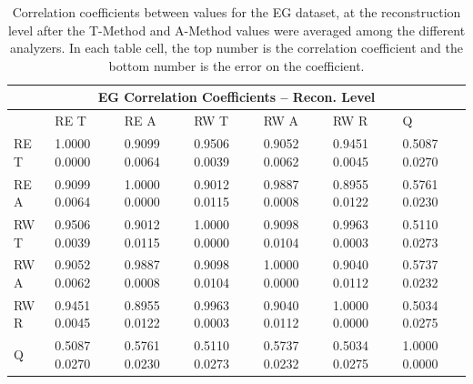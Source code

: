\begin{table}
\setlength\tabcolsep{15pt}
\small
\centering
\renewcommand{\arraystretch}{1.4}
\begin{tabularx}{0.8\linewidth}{@{\extracolsep{\fill}}lXXXXXX}
  \toprule
  	\multicolumn{7}{c}{{\normalsize EG Correlation Coefficients -- Recon. Level}} \\
  \midrule
  	       & RE T & RE A & RW T & RW A & RW R & \quad Q \\
  \midrule
	RE T   & 1.0000 0.0000 & 0.9099 0.0064 & 0.9506 0.0039 & 0.9052 0.0062 & 0.9451 0.0045 & 0.5087 0.0270  \\
	RE A   & 0.9099 0.0064 & 1.0000 0.0000 & 0.9012 0.0115 & 0.9887 0.0008 & 0.8955 0.0122 & 0.5761 0.0230  \\
	RW T   & 0.9506 0.0039 & 0.9012 0.0115 & 1.0000 0.0000 & 0.9098 0.0104 & 0.9963 0.0003 & 0.5110 0.0273  \\
	RW A   & 0.9052 0.0062 & 0.9887 0.0008 & 0.9098 0.0104 & 1.0000 0.0000 & 0.9040 0.0112 & 0.5737 0.0232  \\
	RW R   & 0.9451 0.0045 & 0.8955 0.0122 & 0.9963 0.0003 & 0.9040 0.0112 & 1.0000 0.0000 & 0.5034 0.0275  \\
	Q      & 0.5087 0.0270 & 0.5761 0.0230 & 0.5110 0.0273 & 0.5737 0.0232 & 0.5034 0.0275 & 1.0000 0.0000  \\
  \bottomrule
\end{tabularx}
\caption[]{Correlation coefficients between \R values for the EG dataset, at the reconstruction level after the \RW T-Method and A-Method \R values were averaged among the different analyzers. In each table cell, the top number is the correlation coefficient and the bottom number is the error on the coefficient.}
\label{tab:Corrs_EG_recon}
\end{table}



